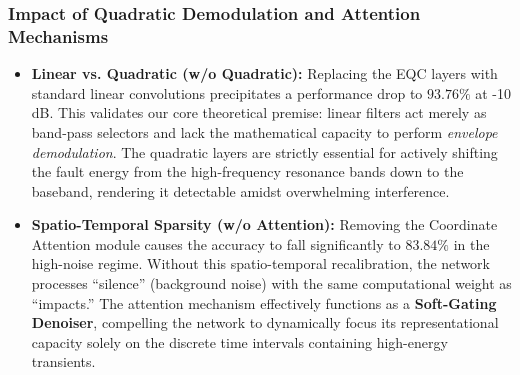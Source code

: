 \documentclass[5p,times,twocolumn]{elsarticle}
\begin{document}
\subsubsection{Impact of Quadratic Demodulation and Attention Mechanisms}
\begin{itemize}
    \item \textbf{Linear vs. Quadratic (w/o Quadratic):} Replacing the EQC layers with standard linear convolutions precipitates a performance drop to $93.76\%$ at -10 dB. This validates our core theoretical premise: linear filters act merely as band-pass selectors and lack the mathematical capacity to perform \textit{envelope demodulation}. The quadratic layers are strictly essential for actively shifting the fault energy from the high-frequency resonance bands down to the baseband, rendering it detectable amidst overwhelming interference.
    
    \item \textbf{Spatio-Temporal Sparsity (w/o Attention):} Removing the Coordinate Attention module causes the accuracy to fall significantly to $83.84\%$ in the high-noise regime. Without this spatio-temporal recalibration, the network processes ``silence'' (background noise) with the same computational weight as ``impacts.'' The attention mechanism effectively functions as a \textbf{Soft-Gating Denoiser}, compelling the network to dynamically focus its representational capacity solely on the discrete time intervals containing high-energy transients.
\end{itemize}

\begin{table}[htbp]
\centering
\caption{\textbf{Component-Wise Ablation Analysis.} Diagnostic accuracy (\%) under varying noise intensities. The substantial accuracy collapse in the ``w/o Statistical Stream'' variant at -10 dB empirically underscores the absolute necessity of hybrid physics-data fusion in industrial regimes.}
\label{tab:ablation}
\renewcommand{\arraystretch}{1.2}
\setlength{\tabcolsep}{8pt}
\end{table}
\end{document}

